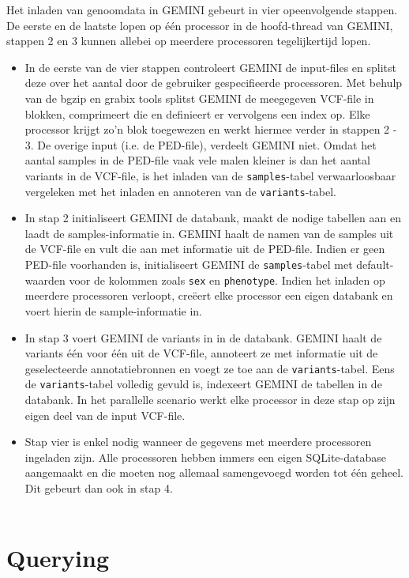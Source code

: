 Het inladen van genoomdata in GEMINI gebeurt in vier opeenvolgende stappen. De eerste en de laatste lopen op \'e\'en processor in de hoofd-thread van GEMINI, stappen 2 en 3 kunnen allebei op meerdere processoren tegelijkertijd lopen. 
\begin{itemize}
\item In de eerste van de vier stappen controleert GEMINI de input-files en splitst deze over het aantal door de gebruiker gespecifieerde processoren. Met behulp van de bgzip \cite{bgzip} en grabix \cite{grabix} tools splitst GEMINI de meegegeven VCF-file in blokken, comprimeert die en definieert er vervolgens een index op. Elke processor krijgt zo'n blok toegewezen en werkt hiermee verder in stappen 2 - 3. De overige input (i.e. de PED-file), verdeelt GEMINI niet. Omdat het aantal samples in de PED-file vaak vele malen kleiner is dan het aantal variants in de VCF-file, is het inladen van de \texttt{samples}-tabel verwaarloosbaar vergeleken met het inladen en annoteren van de \texttt{variants}-tabel.
\item In stap 2 initialiseert GEMINI de databank, maakt de nodige tabellen aan en laadt de samples-informatie in. GEMINI haalt de namen van de samples uit de VCF-file en vult die aan met informatie uit de PED-file. Indien er geen PED-file voorhanden is, initialiseert GEMINI de \texttt{samples}-tabel met default-waarden voor de kolommen zoals \texttt{sex} en \texttt{phenotype}. Indien het inladen op meerdere processoren verloopt, cre\"eert elke processor een eigen databank en voert hierin de sample-informatie in.
\item In stap 3 voert GEMINI de variants in in de databank. GEMINI haalt de variants \'e\'en voor \'e\'en uit de VCF-file, annoteert ze met informatie uit de geselecteerde annotatiebronnen en voegt ze toe aan de \texttt{variants}-tabel. Eens de \texttt{variants}-tabel volledig gevuld is, indexeert GEMINI de tabellen in de databank. In het parallelle scenario werkt elke processor in deze stap op zijn eigen deel van de input VCF-file.
\item Stap vier is enkel nodig wanneer de gegevens met meerdere processoren ingeladen zijn. Alle processoren hebben immers een eigen SQLite-database aangemaakt en die moeten nog allemaal samengevoegd worden tot \'e\'en geheel. Dit gebeurt dan ook in stap 4.\\\\
\end{itemize}


\newpage
\section{Querying}

